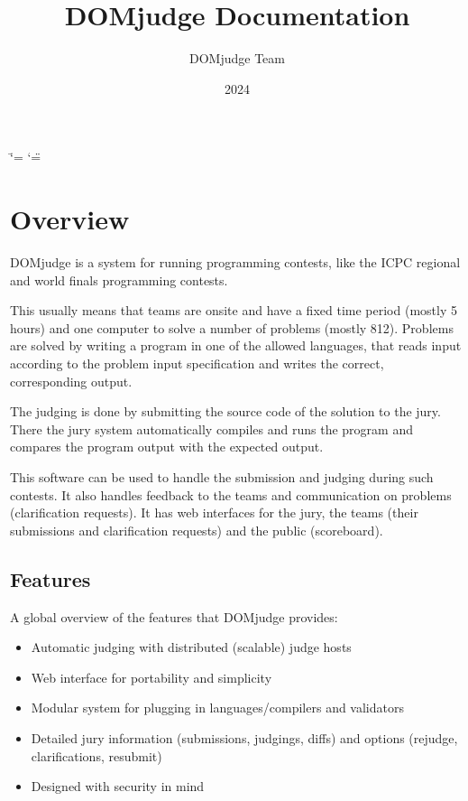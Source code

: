 \documentclass[a4paper,10pt,english,openany]{sphinxmanual}
\title{DOMjudge Documentation}
\date{2024}
\author{DOMjudge Team}
\begin{document}
\ifdefined\shorthandoff
  \ifnum\catcode`\=\string=\active\shorthandoff{=}\fi
  \ifnum\catcode`\"=\active{}\fi
\fi

\pagestyle{empty}

\pagestyle{plain}

\pagestyle{normal}
\label{\detokenize{index::doc}}


\sphinxstepscope


\section{Overview}
\label{\detokenize{overview:overview}}\label{\detokenize{overview::doc}}
\sphinxAtStartPar
DOMjudge is a system for running programming contests, like the ICPC
regional and world finals programming contests.

\sphinxAtStartPar
This usually means that teams are on\sphinxhyphen{}site and have a fixed time period (mostly
5 hours) and one computer to solve a number of problems (mostly 8\sphinxhyphen{}12). Problems
are solved by writing a program in one of the allowed languages, that reads
input according to the problem input specification and writes the correct,
corresponding output.

\sphinxAtStartPar
The judging is done by submitting the source code of the solution to the jury.
There the jury system automatically compiles and runs the program and compares
the program output with the expected output.

\sphinxAtStartPar
This software can be used to handle the submission and judging during such
contests. It also handles feedback to the teams and communication on problems
(clarification requests). It has web interfaces for the jury, the teams (their
submissions and clarification requests) and the public (scoreboard).


\subsection{Features}
\label{\detokenize{overview:features}}
\sphinxAtStartPar
A global overview of the features that DOMjudge provides:
\begin{itemize}
\item {} 
\sphinxAtStartPar
Automatic judging with distributed (scalable) judge hosts

\item {} 
\sphinxAtStartPar
Web interface for portability and simplicity

\item {} 
\sphinxAtStartPar
Modular system for plugging in languages/compilers and validators

\item {} 
\sphinxAtStartPar
Detailed jury information (submissions, judgings, diffs)
and options (rejudge, clarifications, resubmit)

\item {} 
\sphinxAtStartPar
Designed with security in mind

\end{itemize}
\end{document}
